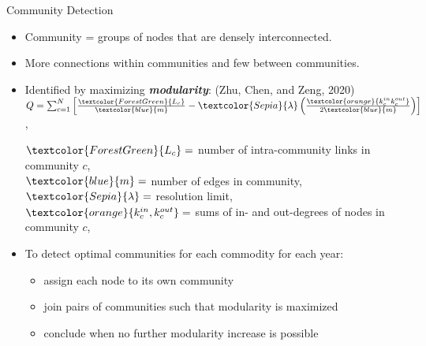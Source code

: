 \documentclass[10pt,xcolor={dvipsnames}]{beamer}
\begin{document}
\begin{frame}{Community Detection}
    \begin{itemize}\itemsep20pt
        \small
        \item[\ding{213}] Community = groups of nodes that are densely interconnected.
        \item[\ding{213}] More connections within communities and few between communities.
        \item[\ding{213}] Identified by maximizing \textit{\textbf{modularity}}: \scriptsize (Zhu, Chen, and Zeng, 2020)\\
         \small \centering $ Q =  \sum_{c=1}^{N} \left [ \frac{\textcolor{ForestGreen}{L_c}}{\textcolor{blue}{m}} - \textcolor{Sepia}{\lambda} \left( \frac{\textcolor{orange}{k_c^{in} k_c^{out}}}{2\textcolor{blue}{m}}\right) \right]$,\\
        \scriptsize 
        \raggedright
            $\textcolor{ForestGreen}{L_c} = $ number of intra-community links in community $c$,\\
            $\textcolor{blue}{m} = $ number of edges in community, \\
            $\textcolor{Sepia}{\lambda}= $ resolution limit, \\
            $\textcolor{orange}{k_c^{in}, k_c^{out}} = $ sums of in- and out-degrees of nodes in community $c$, \\
        
        \small
        \item[\ding{213}] To detect optimal communities for each commodity for each year:    
        
        \begin{itemize}\itemsep2pt
            \scriptsize
            \item assign each node to its own community
            \item join pairs of communities such that modularity is maximized
            \item conclude when no further modularity increase is possible
        \end{itemize}
    \end{itemize}  
\end{frame}
\end{document}

